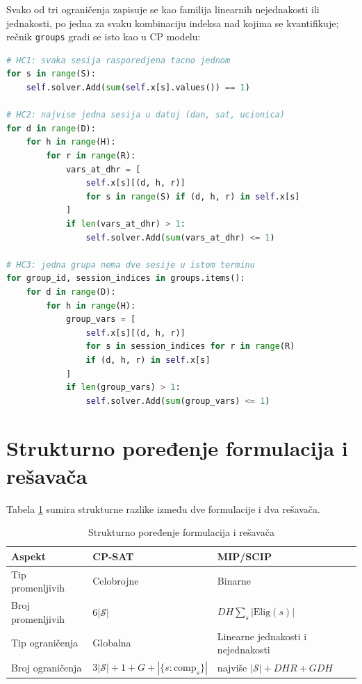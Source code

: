 \documentclass[12pt,oneside]{memoir}
\begin{document}
Svako od tri ograničenja zapisuje se kao familija linearnih
nejednakosti ili jednakosti, po jedna za svaku kombinaciju indeksa nad kojima se
kvantifikuje; rečnik \texttt{groups} gradi se isto kao u CP modelu:

\begin{english}
\begin{lstlisting}[language=Python, caption={Tvrda ograničenja u MIP modelu}]
# HC1: svaka sesija rasporedjena tacno jednom
for s in range(S):
    self.solver.Add(sum(self.x[s].values()) == 1)

# HC2: najvise jedna sesija u datoj (dan, sat, ucionica)
for d in range(D):
    for h in range(H):
        for r in range(R):
            vars_at_dhr = [
                self.x[s][(d, h, r)]
                for s in range(S) if (d, h, r) in self.x[s]
            ]
            if len(vars_at_dhr) > 1:
                self.solver.Add(sum(vars_at_dhr) <= 1)

# HC3: jedna grupa nema dve sesije u istom terminu
for group_id, session_indices in groups.items():
    for d in range(D):
        for h in range(H):
            group_vars = [
                self.x[s][(d, h, r)]
                for s in session_indices for r in range(R)
                if (d, h, r) in self.x[s]
            ]
            if len(group_vars) > 1:
                self.solver.Add(sum(group_vars) <= 1)
\end{lstlisting}
\end{english}

\section{Strukturno poređenje formulacija i rešavača}
\label{sec:poredjenje_formulacija}

Tabela \ref{tbl:formulacije} sumira strukturne razlike između dve
formulacije i dva rešavača.

\begin{table}[ht]
\centering
\caption{Strukturno poređenje formulacija i rešavača}
\label{tbl:formulacije}
\begin{tabular}{lll}
\toprule
\textbf{Aspekt} & \textbf{CP-SAT} & \textbf{MIP/SCIP} \\
\midrule
Tip promenljivih & Celobrojne & Binarne \\
Broj promenljivih & $6|\mathcal{S}|$ &
  $D H \sum_s |\text{Elig}(s)|$ \\
Tip ograničenja & Globalna & Linearne jednakosti i nejednakosti \\
Broj ograničenja & $3|\mathcal{S}| + 1 + G + |\{s : \text{comp}_s\}|$ &
  najviše $|\mathcal{S}| + DHR + GDH$ \\
\bottomrule
\end{tabular}
\end{table}
\end{document}
